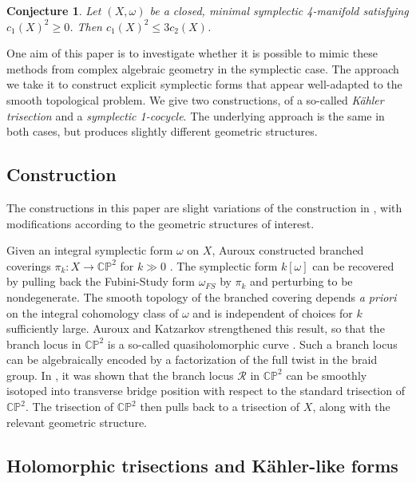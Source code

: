 \documentclass[11pt]{amsart}
\newtheorem{conjecture}[theorem]{Conjecture}
\theoremstyle{definition}
\theoremstyle{remark}
\numberwithin{equation}{section}
\newcommand{\cR}{\mathcal{R}}
\newcommand{\CP}{\mathbb{CP}}
\begin{document}
\begin{conjecture}
    Let $(X,\omega)$ be a closed, minimal symplectic 4-manifold satisfying $c_1(X)^2  \geq 0$.  Then $c_1(X)^2 \leq 3c_2(X)$.
\end{conjecture}

One aim of this paper is to investigate whether it is possible to mimic these methods from complex algebraic geometry in the symplectic case.  The approach we take it to construct explicit symplectic forms that appear well-adapted to the smooth topological problem.  We give two constructions, of a so-called {\it K\"ahler trisection} and a {\it symplectic 1-cocycle}.  The underlying approach is the same in both cases, but produces slightly different geometric structures.



\subsection{Construction}

The constructions in this paper are slight variations of the construction in \cite{LMS}, with modifications according to the geometric structures of interest.

Given an integral symplectic form $\omega$ on $X$, Auroux constructed branched coverings $\pi_k: X \rightarrow \CP^2$ for $k \gg 0$ \cite{Auroux-branched}.  The symplectic form $k[\omega]$ can be recovered by pulling back the Fubini-Study form $\omega_{FS}$ by $\pi_k$ and perturbing to be nondegenerate.  The smooth topology of the branched covering depends {\it a priori} on the integral cohomology class of $\omega$ and is independent of choices for $k$ sufficiently large.  Auroux and Katzarkov strengthened this result, so that the branch locus in $\CP^2$ is a so-called quasiholomorphic curve \cite{AK-branched}.  Such a branch locus can be algebraically encoded by a factorization of the full twist in the braid group.  In \cite{LC-symp-surfaces}, it was shown that the branch locus $\cR$ in $\CP^2$ can be smoothly isotoped into transverse bridge position with respect to the standard trisection of $\CP^2$.  The trisection of $\CP^2$ then pulls back to a trisection of $X$, along with the relevant geometric structure.  

\subsection{Holomorphic trisections and K\"ahler-like forms}
\end{document}
